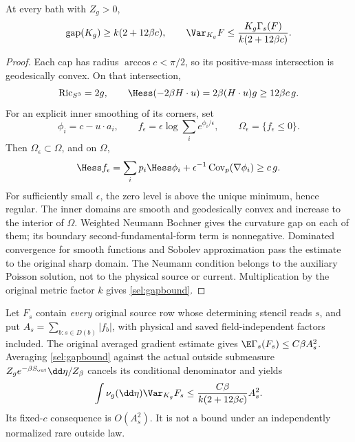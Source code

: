 \begin{proposition}
\label{sel:gap}
At every bath with \(Z_g>0\),
\begin{equation}
 \operatorname{gap}(K_g)\ge k(2+12\beta c),\qquad
 \Var_{K_g}F\le
       \frac{K_g\Gamma_s(F)}{k(2+12\beta c)}.
 \label{sel:gapbound}
\end{equation}
\end{proposition}
\begin{proof}
Each cap has radius \(\arccos c<\pi/2\), so its positive-mass intersection is geodesically convex. On that intersection,
\[
 \operatorname{Ric}_{S^3}=2g,\qquad
 \Hess(-2\beta H\cdot u)=2\beta(H\cdot u)g\ge12\beta c\,g.
\]
For an explicit inner smoothing of its corners, set
\[
 \phi_i=c-u\cdot a_i,\qquad
 f_\epsilon=\epsilon\log\sum_i e^{\phi_i/\epsilon},
 \qquad \Omega_\epsilon=\{f_\epsilon\le0\}.
\]
Then \(\Omega_\epsilon\subset\Omega\), and on \(\Omega\),
\[
 \Hess f_\epsilon
 =\sum_i p_i\Hess\phi_i+
       \epsilon^{-1}\operatorname{Cov}_{p}(\nabla\phi_i)
 \ge c\,g.
\]
For sufficiently small \(\epsilon\), the zero level is above the unique minimum, hence regular. The inner domains are smooth and geodesically convex and increase to the interior of \(\Omega\). Weighted Neumann Bochner gives the curvature gap on each of them; its boundary second-fundamental-form term is nonnegative. Dominated convergence for smooth functions and Sobolev approximation pass the estimate to the original sharp domain. The Neumann condition belongs to the auxiliary Poisson solution, not to the physical source or current. Multiplication by the original metric factor \(k\) gives \eqref{sel:gapbound}.
\end{proof}

Let \(F_s\) contain \emph{every} original source row whose determining stencil reads \(s\), and put \(A_s=\sum_{b:s\in D(b)}|f_b|\), with physical and saved field-independent factors included. The original averaged gradient estimate gives \(\E\Gamma_s(F_s)\le C\beta A_s^2\). Averaging \eqref{sel:gapbound} against the actual outside submeasure \(Z_g e^{-\beta S_{\rm out}}\dd\eta/Z_\beta\) cancels its conditional denominator and yields
\[
 \int \nu_g(\dd\eta)\Var_{K_g}F_s
 \le \frac{C\beta}{k(2+12\beta c)}A_s^2.
\]
Its fixed-\(c\) consequence is \(O(A_s^2)\). It is not a bound under an independently normalized rare outside law.

